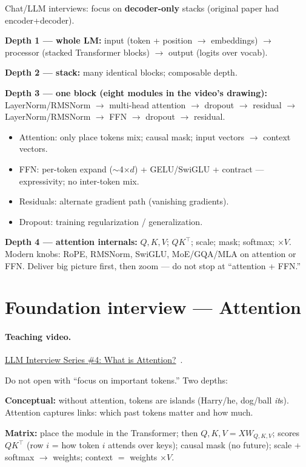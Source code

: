 \documentclass[11pt,a4paper]{article}
\begin{document}
Chat/LLM interviews: focus on \textbf{decoder-only} stacks (original paper had encoder+decoder).

\textbf{Depth 1 --- whole LM:} input (token + position $\to$ embeddings) $\rightarrow$ processor (stacked Transformer blocks) $\rightarrow$ output (logits over vocab).

\textbf{Depth 2 --- stack:} many identical blocks; composable depth.

\textbf{Depth 3 --- one block (eight modules in the video's drawing):}
LayerNorm/RMSNorm $\rightarrow$ multi-head attention $\rightarrow$ dropout $\rightarrow$ residual $\rightarrow$
LayerNorm/RMSNorm $\rightarrow$ FFN $\rightarrow$ dropout $\rightarrow$ residual.

\begin{itemize}[leftmargin=*]
  \item Attention: only place tokens mix; causal mask; input vectors $\to$ context vectors.
  \item FFN: per-token expand ($\sim$4$\times d$) + GELU/SwiGLU + contract --- expressivity; no inter-token mix.
  \item Residuals: alternate gradient path (vanishing gradients).
  \item Dropout: training regularization / generalization.
\end{itemize}

\textbf{Depth 4 --- attention internals:} $Q,K,V$; $QK^\top$; scale; mask; softmax; $\times V$.
Modern knobs: RoPE, RMSNorm, SwiGLU, MoE/GQA/MLA on attention or FFN.
Deliver big picture first, then zoom --- do not stop at ``attention + FFN.''

\section{Foundation interview --- Attention}
\paragraph{Teaching video.}
\href{https://www.youtube.com/watch?v=cquX2tOODUI}{LLM Interview Series \#4: What is Attention?}~\cite{vizuara-attention-yt}.

Do not open with ``focus on important tokens.'' Two depths:

\textbf{Conceptual:} without attention, tokens are islands (Harry/he, dog/ball \emph{it}s).
Attention captures links: which past tokens matter and how much.

\textbf{Matrix:} place the module in the Transformer; then
$Q,K,V=XW_{Q,K,V}$; scores $QK^\top$ (row $i$ = how token $i$ attends over keys);
causal mask (no future); scale + softmax $\to$ weights; context $=$ weights $\times V$.
\end{document}
